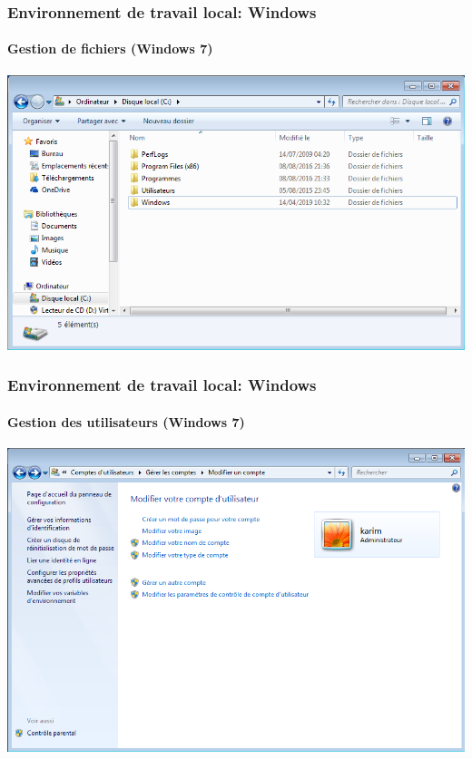 \documentclass{beamer}
\begin{document}
\begin{frame}
\frametitle{Environnement de travail local: Windows}
\framesubtitle{Gestion de fichiers (Windows 7)}

\begin{center}
	\includegraphics[height=
	.8\textheight]{../img/Bweb01-environnement/win7-files.png}
\end{center}

\end{frame}

\begin{frame}
\frametitle{Environnement de travail local: Windows}
\framesubtitle{Gestion des utilisateurs (Windows 7)}

\begin{center}
	\includegraphics[height=
	.8\textheight]{../img/Bweb01-environnement/win7-users.png}
\end{center}

\end{frame}
\end{document}
